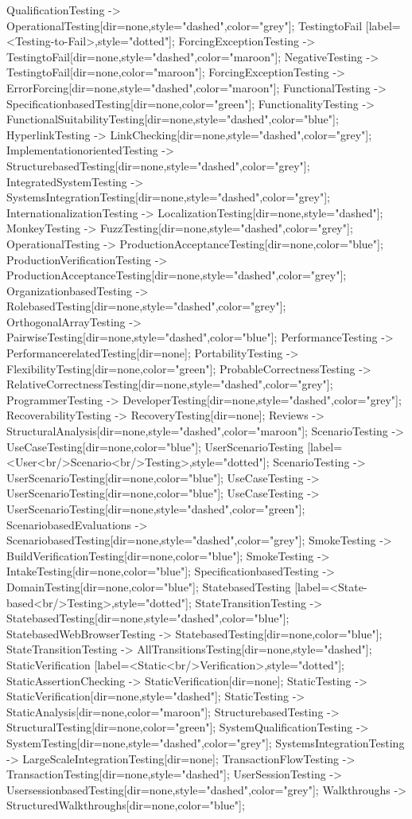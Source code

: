 \documentclass{article}
\begin{document}
{QualificationTesting -> OperationalTesting[dir=none,style="dashed",color="grey"];
TestingtoFail [label=<Testing-to-Fail>,style="dotted"];
ForcingExceptionTesting -> TestingtoFail[dir=none,style="dashed",color="maroon"];
NegativeTesting -> TestingtoFail[dir=none,color="maroon"];
ForcingExceptionTesting -> ErrorForcing[dir=none,style="dashed",color="maroon"];
FunctionalTesting -> SpecificationbasedTesting[dir=none,color="green"];
FunctionalityTesting -> FunctionalSuitabilityTesting[dir=none,style="dashed",color="blue"];
HyperlinkTesting -> LinkChecking[dir=none,style="dashed",color="grey"];
ImplementationorientedTesting -> StructurebasedTesting[dir=none,style="dashed",color="grey"];
IntegratedSystemTesting -> SystemsIntegrationTesting[dir=none,style="dashed",color="grey"];
InternationalizationTesting -> LocalizationTesting[dir=none,style="dashed"];
MonkeyTesting -> FuzzTesting[dir=none,style="dashed",color="grey"];
OperationalTesting -> ProductionAcceptanceTesting[dir=none,color="blue"];
ProductionVerificationTesting -> ProductionAcceptanceTesting[dir=none,style="dashed",color="grey"];
OrganizationbasedTesting -> RolebasedTesting[dir=none,style="dashed",color="grey"];
OrthogonalArrayTesting -> PairwiseTesting[dir=none,style="dashed",color="blue"];
PerformanceTesting -> PerformancerelatedTesting[dir=none];
PortabilityTesting -> FlexibilityTesting[dir=none,color="green"];
ProbableCorrectnessTesting -> RelativeCorrectnessTesting[dir=none,style="dashed",color="grey"];
ProgrammerTesting -> DeveloperTesting[dir=none,style="dashed",color="grey"];
RecoverabilityTesting -> RecoveryTesting[dir=none];
Reviews -> StructuralAnalysis[dir=none,style="dashed",color="maroon"];
ScenarioTesting -> UseCaseTesting[dir=none,color="blue"];
UserScenarioTesting [label=<User<br/>Scenario<br/>Testing>,style="dotted"];
ScenarioTesting -> UserScenarioTesting[dir=none,color="blue"];
UseCaseTesting -> UserScenarioTesting[dir=none,color="blue"];
UseCaseTesting -> UserScenarioTesting[dir=none,style="dashed",color="green"];
ScenariobasedEvaluations -> ScenariobasedTesting[dir=none,style="dashed",color="grey"];
SmokeTesting -> BuildVerificationTesting[dir=none,color="blue"];
SmokeTesting -> IntakeTesting[dir=none,color="blue"];
SpecificationbasedTesting -> DomainTesting[dir=none,color="blue"];
StatebasedTesting [label=<State-based<br/>Testing>,style="dotted"];
StateTransitionTesting -> StatebasedTesting[dir=none,style="dashed",color="blue"];
StatebasedWebBrowserTesting -> StatebasedTesting[dir=none,color="blue"];
StateTransitionTesting -> AllTransitionsTesting[dir=none,style="dashed"];
StaticVerification [label=<Static<br/>Verification>,style="dotted"];
StaticAssertionChecking -> StaticVerification[dir=none];
StaticTesting -> StaticVerification[dir=none,style="dashed"];
StaticTesting -> StaticAnalysis[dir=none,color="maroon"];
StructurebasedTesting -> StructuralTesting[dir=none,color="green"];
SystemQualificationTesting -> SystemTesting[dir=none,style="dashed",color="grey"];
SystemsIntegrationTesting -> LargeScaleIntegrationTesting[dir=none];
TransactionFlowTesting -> TransactionTesting[dir=none,style="dashed"];
UserSessionTesting -> UsersessionbasedTesting[dir=none,style="dashed",color="grey"];
Walkthroughs -> StructuredWalkthroughs[dir=none,color="blue"];

}
\end{document}
